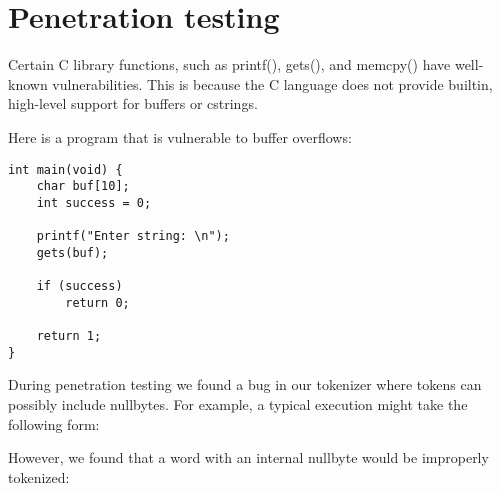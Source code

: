 \documentclass[12pt]{article}
\begin{document}
\section{Penetration testing}
Certain C library functions, such as printf(), gets(), and memcpy() have well-known vulnerabilities\cite{formatstring,smashingthestack}. This is because the C language does not provide builtin, high-level support for buffers or cstrings. 

Here is a program that is vulnerable to buffer overflows:
\begin{lstlisting}[frame=single]
int main(void) {
    char buf[10];
    int success = 0;
    
    printf("Enter string: \n");
    gets(buf);

    if (success)
        return 0;

    return 1;
}
\end{lstlisting}

During penetration testing we found a bug in our tokenizer where tokens can possibly include nullbytes. For example, a typical execution might take the following form:


However, we found that a word with an internal nullbyte would be improperly tokenized:

\end{document}
